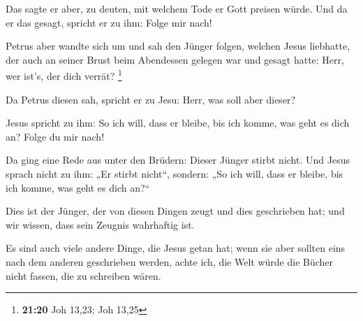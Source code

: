  Das sagte er aber, zu deuten, mit welchem Tode er Gott
preisen würde. Und da er das gesagt, spricht er zu ihm: Folge mir nach!

 Petrus aber wandte sich um und sah den Jünger folgen,
welchen Jesus liebhatte, der auch an seiner Brust beim Abendessen
gelegen war und gesagt hatte: Herr, wer ist's, der dich verrät?
\footnote{\textbf{21:20} Joh 13,23; Joh 13,25}

 Da Petrus diesen sah, spricht er zu Jesu: Herr, was soll
aber dieser?

 Jesus spricht zu ihm: So ich will, dass er bleibe, bis ich
komme, was geht es dich an? Folge du mir nach!

 Da ging eine Rede aus unter den Brüdern: Dieser Jünger
stirbt nicht. Und Jesus sprach nicht zu ihm: „Er stirbt nicht``,
sondern: „So ich will, dass er bleibe, bis ich komme, was geht es dich
an?{}``

 Dies ist der Jünger, der von diesen Dingen zeugt und dies
geschrieben hat; und wir wissen, dass sein Zeugnis wahrhaftig ist.

 Es sind auch viele andere Dinge, die Jesus getan hat; wenn
sie aber sollten eins nach dem anderen geschrieben werden, achte ich,
die Welt würde die Bücher nicht fassen, die zu schreiben wären.

